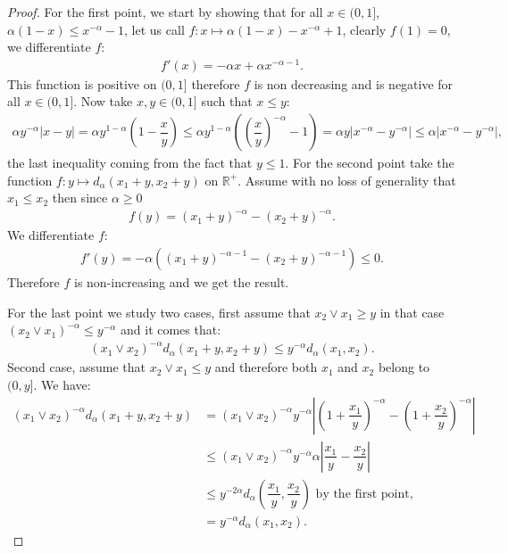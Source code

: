 \documentclass[11pt,a4paper]{article}
\newcommand{\RR}{\mathbb{R}}
\begin{document}
\begin{proof}
    For the first point, we start by showing that for all $x \in (0,1]$, $\alpha(1-x) \leq x^{-\alpha} - 1$, let us call $f : x\mapsto \alpha(1-x) -x^{-\alpha} + 1$, clearly $f(1) = 0$, we differentiate $f$:
    \begin{align*}
        f'(x) = -\alpha x +  \alpha x^{-\alpha - 1}.
    \end{align*}
    This function is positive on $(0,1]$ therefore $f$ is non decreasing and is negative for all $x\in (0,1]$. Now take $x,y \in (0,1]$ such that $x \leq y$:
    \begin{align*}
        \alpha y^{-\alpha }|x - y| = \alpha y^{1-\alpha } \left(1 - \dfrac{x}{y}\right) \leq \alpha y^{1-\alpha } \left(\left(\dfrac{x}{y}\right)^{-\alpha} - 1 \right) = 
        \alpha y \left|x^{-\alpha} - y^{-\alpha}\right| \leq \alpha \left|x^{-\alpha} - y^{-\alpha}\right|,
    \end{align*}
    the last inequality coming from the fact that $y \leq 1$. For the second point take the function $f : y \mapsto d_\alpha(x_1 + y,x_2 + y)$ on $\RR^+$. Assume with no loss of generality that $x_1 \leq x_2$ then since $\alpha \geq 0$
    \begin{align*}
        f(y) = (x_1 + y)^{-\alpha} - (x_2 + y)^{-\alpha}.
    \end{align*}
    We differentiate $f$:
    \begin{align*}
        f'(y) = -\alpha((x_1 + y)^{-\alpha-1} - (x_2 + y)^{-\alpha-1}) \leq 0.
    \end{align*}
    Therefore $f$ is non-increasing and we get the result.
    
    For the last point we study two cases, first assume that $x_2\vee x_1 \geq y$ in that case $(x_2\vee x_1)^{-\alpha} \leq y^{-\alpha}$ and it comes that:
    \begin{align*}
        (x_1 \vee x_2)^{-\alpha} d_\alpha(x_1 + y,x_2 + y) \leq y^{-\alpha} d_\alpha(x_1,x_2).
    \end{align*}
    Second case, assume that $x_2\vee x_1 \leq y$ and therefore both $x_1$ and $x_2$ belong to $(0,y]$. We have:
    \begin{align*}
        (x_1\vee x_2)^{-\alpha}d_\alpha(x_1 + y,x_2 + y) &= (x_1\vee x_2)^{-\alpha}y^{-\alpha} \left|\left(1 + \dfrac{x_1}{y}\right)^{-\alpha} - \left(1 + \dfrac{x_2}{y}\right)^{-\alpha} \right| \\
        &\leq (x_1\vee x_2)^{-\alpha}y^{-\alpha}\alpha \left|\dfrac{x_1}{y} - \dfrac{x_2}{y} \right|\\
        &\leq y^{-2\alpha}d_\alpha\left(\dfrac{x_1}{y},\dfrac{x_2}{y}\right) \text{ by the first point,}\\
        &= y^{-\alpha} d_\alpha(x_1,x_2).
    \end{align*}
\end{proof}
\end{document}
